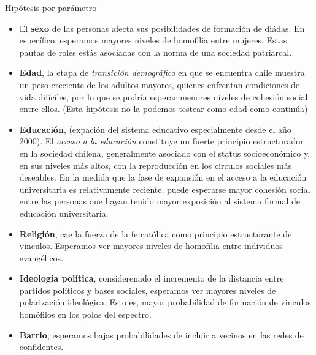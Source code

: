 \documentclass[
  8pt,
  ignorenonframetext,
]{beamer}
\begin{document}
\begin{frame}{Hipótesis por parámetro}
\protect\hypertarget{hipuxf3tesis-por-paruxe1metro}{}
\begin{itemize}
\item
  El \textbf{sexo} de las personas afecta sus posibilidades de formación
  de diádas. En específico, esperamos mayores niveles de homofilia entre
  mujeres. Estas pautas de roles estás asociadas con la norma de una
  sociedad patriarcal.
\item
  \textbf{Edad}, la etapa de \emph{transición demográfica} en que se
  encuentra chile muestra un peso creciente de los adultos mayores,
  quienes enfrentan condiciones de vida difíciles, por lo que se podría
  esperar menores niveles de cohesión social entre ellos. (Esta
  hipótesis no la podemos testear como edad como continúa)
\item
  \textbf{Educación}, (expación del sistema educativo especialmente
  desde el año 2000). El \emph{acceso a la educación} constituye un
  fuerte principio estructurador en la sociedad chilena, generalmente
  asociado con el status socioeconómico y, en sus niveles más altos, con
  la reproducción en los círculos sociales más deseables. En la medida
  que la fase de expansión en el acceso a la educación universitaria es
  relativamente reciente, puede esperarse mayor cohesión social entre
  las personas que hayan tenido mayor exposición al sistema formal de
  educación universitaria.
\item
  \textbf{Religión}, cae la fuerza de la fe católica como principio
  estructurante de vínculos. Esperamos ver mayores niveles de homofilia
  entre individuos evangélicos.
\item
  \textbf{Ideología política}, considerenado el incremento de la
  distancia entre partidos políticos y bases sociales, esperamos ver
  mayores niveles de polarización ideológica. Esto es, mayor
  probabilidad de formación de vinculos homófilos en los polos del
  espectro.
\item
  \textbf{Barrio}, esperamos bajas probabilidades de incluir a vecinos
  en las redes de confidentes.
\end{itemize}
\end{frame}
\end{document}
